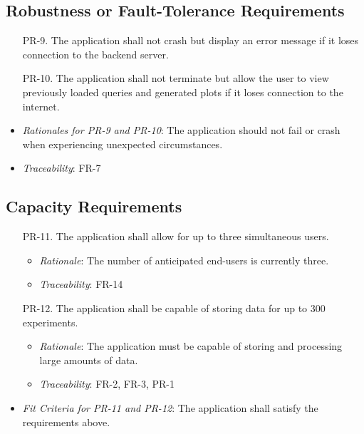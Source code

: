 \documentclass[12pt]{article}
\begin{document}
\subsection{Robustness or Fault-Tolerance Requirements}
\begin{enumerate}
  \item[PR-9.] The application shall not crash but display an error message if it loses connection to the backend server.
  \item[PR-10.] The application shall not terminate but allow the user to view previously loaded queries and generated plots if it loses connection to the internet.
\end{enumerate}
\begin{itemize}
  \item \textit{Rationales for PR-9 and PR-10}: The application should not fail or crash when experiencing unexpected circumstances.
  \item \textit{Traceability}: FR-7
\end{itemize}

\subsection{Capacity Requirements}
\begin{enumerate}
  \item[PR-11.] The application shall allow for up to three simultaneous users.
    \begin{itemize}
      \item \textit{Rationale}: The number of anticipated end-users is currently three.
      \item \textit{Traceability}: FR-14
    \end{itemize}
  \item[PR-12.] The application shall be capable of storing data for up to 300 experiments.
    \begin{itemize}
      \item \textit{Rationale}: The application must be capable of storing and processing large amounts of data.
      \item \textit{Traceability}: FR-2, FR-3, PR-1
    \end{itemize}
\end{enumerate}
\begin{itemize}
  \item \textit{Fit Criteria for PR-11 and PR-12}: The application shall satisfy the requirements above.
\end{itemize}
\end{document}
